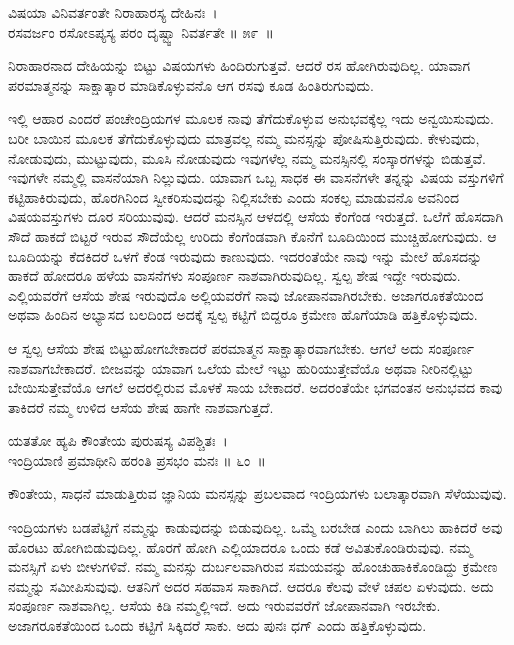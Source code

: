 \begin{shloka}
ವಿಷಯಾ ವಿನಿವರ್ತಂತೇ ನಿರಾಹಾರಸ್ಯ ದೇಹಿನಃ~।\\ರಸವರ್ಜಂ ರಸೋಽಪ್ಯಸ್ಯ ಪರಂ ದೃಷ್ಟ್ವಾ ನಿವರ್ತತೇ \hfill॥ ೫೯~॥
\end{shloka}

\begin{artha}
ನಿರಾಹಾರನಾದ ದೇಹಿಯನ್ನು ಬಿಟ್ಟು ವಿಷಯಗಳು ಹಿಂದಿರುಗುತ್ತವೆ. ಆದರೆ ರಸ ಹೋಗಿರುವುದಿಲ್ಲ. ಯಾವಾಗ ಪರಮಾತ್ಮನನ್ನು ಸಾಕ್ಷಾತ್ಕಾರ ಮಾಡಿಕೊಳ್ಳುವನೊ ಆಗ ರಸವು ಕೂಡ ಹಿಂತಿರುಗುವುದು.
\end{artha}

ಇಲ್ಲಿ ಆಹಾರ ಎಂದರೆ ಪಂಚೇಂದ್ರಿಯಗಳ ಮೂಲಕ ನಾವು ತೆಗೆದುಕೊಳ್ಳುವ ಅನುಭವಕ್ಕೆಲ್ಲ ಇದು ಅನ್ವಯಿಸುವುದು. ಬರೀ ಬಾಯಿನ ಮೂಲಕ ತೆಗೆದುಕೊಳ್ಳುವುದು ಮಾತ್ರವಲ್ಲ ನಮ್ಮ ಮನಸ್ಸನ್ನು ಪೋಷಿಸುತ್ತಿರುವುದು. ಕೇಳುವುದು, ನೋಡುವುದು, ಮುಟ್ಟುವುದು, ಮೂಸಿ ನೋಡುವುದು ಇವುಗಳೆಲ್ಲ ನಮ್ಮ ಮನಸ್ಸಿನಲ್ಲಿ ಸಂಸ್ಕಾರಗಳನ್ನು ಬಿಡುತ್ತವೆ. ಇವುಗಳೇ ನಮ್ಮಲ್ಲಿ ವಾಸನೆಯಾಗಿ ನಿಲ್ಲುವುದು. ಯಾವಾಗ ಒಬ್ಬ ಸಾಧಕ ಈ ವಾಸನೆಗಳೇ ತನ್ನನ್ನು ವಿಷಯ ವಸ್ತುಗಳಿಗೆ ಕಟ್ಟಿಹಾಕಿರುವುದು, ಹೊರಗಿನಿಂದ ಸ್ವೀಕರಿಸುವುದನ್ನು ನಿಲ್ಲಿಸಬೇಕು ಎಂದು ಸಂಕಲ್ಪ ಮಾಡುವನೊ ಅವನಿಂದ ವಿಷಯವಸ್ತುಗಳು ದೂರ ಸರಿಯುವುವು. ಆದರೆ ಮನಸ್ಸಿನ ಆಳದಲ್ಲಿ ಆಸೆಯ ಕೆಂಗೆಂಡ ಇರುತ್ತದೆ. ಒಲೆಗೆ ಹೊಸದಾಗಿ ಸೌದೆ ಹಾಕದೆ ಬಿಟ್ಟರೆ ಇರುವ ಸೌದೆಯೆಲ್ಲ ಉರಿದು ಕೆಂಗೆಂಡವಾಗಿ ಕೊನೆಗೆ ಬೂದಿಯಿಂದ ಮುಚ್ಚಿಹೋಗುವುದು. ಆ ಬೂದಿಯನ್ನು ಕೆದಕಿದರೆ ಒಳಗೆ ಕೆಂಡ ಇರುವುದು ಕಾಣುವುದು. ಇದರಂತೆಯೇ ನಾವು ಇನ್ನು ಮೇಲೆ ಹೊಸದನ್ನು ಹಾಕದೆ ಹೋದರೂ ಹಳೆಯ ವಾಸನೆಗಳು ಸಂಪೂರ್ಣ ನಾಶವಾಗಿರುವುದಿಲ್ಲ. ಸ್ವಲ್ಪ ಶೇಷ ಇದ್ದೇ ಇರುವುದು. ಎಲ್ಲಿಯವರೆಗೆ ಆಸೆಯ ಶೇಷ ಇರುವುದೊ ಅಲ್ಲಿಯವರೆಗೆ ನಾವು ಜೋಪಾನವಾಗಿರಬೇಕು. ಅಜಾಗರೂಕತೆಯಿಂದ ಅಥವಾ ಹಿಂದಿನ ಅಭ್ಯಾಸದ ಬಲದಿಂದ ಅದಕ್ಕೆ ಸ್ವಲ್ಪ ಕಟ್ಟಿಗೆ ಬಿದ್ದರೂ ಕ್ರಮೇಣ ಹೊಗೆಯಾಡಿ ಹತ್ತಿಕೊಳ್ಳುವುದು.

ಆ ಸ್ವಲ್ಪ ಆಸೆಯ ಶೇಷ ಬಿಟ್ಟುಹೋಗಬೇಕಾದರೆ ಪರಮಾತ್ಮನ ಸಾಕ್ಷಾತ್ಕಾರವಾಗಬೇಕು. ಆಗಲೆ ಅದು ಸಂಪೂರ್ಣ ನಾಶವಾಗಬೇಕಾದರೆ. ಬೀಜವನ್ನು ಯಾವಾಗ ಒಲೆಯ ಮೇಲೆ ಇಟ್ಟು ಹುರಿಯುತ್ತೇವೆಯೊ ಅಥವಾ ನೀರಿನಲ್ಲಿಟ್ಟು ಬೇಯಿಸುತ್ತೇವೆಯೊ ಆಗಲೆ ಅದರಲ್ಲಿರುವ ಮೊಳಕೆ ಸಾಯ ಬೇಕಾದರೆ. ಅದರಂತೆಯೇ ಭಗವಂತನ ಅನುಭವದ ಕಾವು ತಾಕಿದರೆ ನಮ್ಮ ಉಳಿದ ಆಸೆಯ ಶೇಷ ಹಾಗೇ ನಾಶವಾಗುತ್ತದೆ.

\begin{shloka}
ಯತತೋ ಹ್ಯಪಿ ಕೌಂತೇಯ ಪುರುಷಸ್ಯ ವಿಪಶ್ಚಿತಃ~।\\ಇಂದ್ರಿಯಾಣಿ ಪ್ರಮಾಥೀನಿ ಹರಂತಿ ಪ್ರಸಭಂ ಮನಃ \hfill॥ ೬ಂ~॥
\end{shloka}

\begin{artha}
ಕೌಂತೇಯ, ಸಾಧನೆ ಮಾಡುತ್ತಿರುವ ಜ್ಞಾನಿಯ ಮನಸ್ಸನ್ನು ಪ್ರಬಲವಾದ ಇಂದ್ರಿಯಗಳು ಬಲಾತ್ಕಾರವಾಗಿ ಸೆಳೆಯುವುವು.
\end{artha}

ಇಂದ್ರಿಯಗಳು ಬಡಪೆಟ್ಟಿಗೆ ನಮ್ಮನ್ನು ಕಾಡುವುದನ್ನು ಬಿಡುವುದಿಲ್ಲ. ಒಮ್ಮೆ ಬರಬೇಡ ಎಂದು ಬಾಗಿಲು ಹಾಕಿದರೆ ಅವು ಹೊರಟು ಹೋಗಿಬಿಡುವುದಿಲ್ಲ. ಹೊರಗೆ ಹೋಗಿ ಎಲ್ಲಿಯಾದರೂ ಒಂದು ಕಡೆ ಅವಿತುಕೊಂಡಿರುವುವು. ನಮ್ಮ ಮನಸ್ಸಿಗೆ ಏಳು ಬೀಳುಗಳಿವೆ. ನಮ್ಮ ಮನಸ್ಸು ದುರ್ಬಲವಾಗಿರುವ ಸಮಯವನ್ನು ಹೊಂಚುಹಾಕಿಕೊಂಡಿದ್ದು ಕ್ರಮೇಣ ನಮ್ಮನ್ನು ಸಮೀಪಿಸುವುವು. ಆತನಿಗೆ ಅದರ ಸಹವಾಸ ಸಾಕಾಗಿದೆ. ಆದರೂ ಕೆಲವು ವೇಳೆ ಚಪಲ ಏಳುವುದು. ಅದು ಸಂಪೂರ್ಣ ನಾಶವಾಗಿಲ್ಲ. ಆಸೆಯ ಕಿಡಿ ನಮ್ಮಲ್ಲಿಇದೆ. ಅದು ಇರುವವರೆಗೆ ಜೋಪಾನವಾಗಿ ಇರಬೇಕು. ಅಜಾಗರೂಕತೆಯಿಂದ ಒಂದು ಕಟ್ಟಿಗೆ ಸಿಕ್ಕಿದರೆ ಸಾಕು. ಅದು ಪುನಃ ಧಗ್ ಎಂದು ಹತ್ತಿಕೊಳ್ಳುವುದು.

